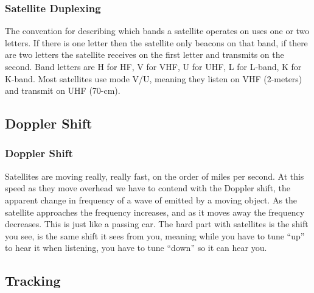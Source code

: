 \documentclass[10pt, handout]{beamer}
\begin{document}
\begin{frame}
\frametitle{Satellite Duplexing}
The convention for describing which bands a satellite operates on uses one or two letters. If there is one letter then the satellite only beacons on that band, if there are two letters the satellite receives on the first letter and transmits on the second. Band letters are H for HF, V for VHF, U for UHF, L for L-band, K for K-band.  Most satellites use mode V/U, meaning they listen on VHF (2-meters) and transmit on UHF (70-cm).
\end{frame}

\subsection{Doppler Shift}

\begin{frame}
\frametitle{Doppler Shift}
Satellites are moving really, really fast, on the order of miles per second. At this speed as they move overhead we have to contend with the Doppler shift, the apparent change in frequency of a wave of emitted by a moving object. As the satellite approaches the frequency increases, and as it moves away the frequency decreases. This is just like a passing car. The hard part with satellites is the shift you see, is the same shift it sees from you, meaning while you have to tune ``up'' to hear it when listening, you have to tune ``down'' so it can hear you.
\end{frame}

\subsection{Tracking}
\end{document}
